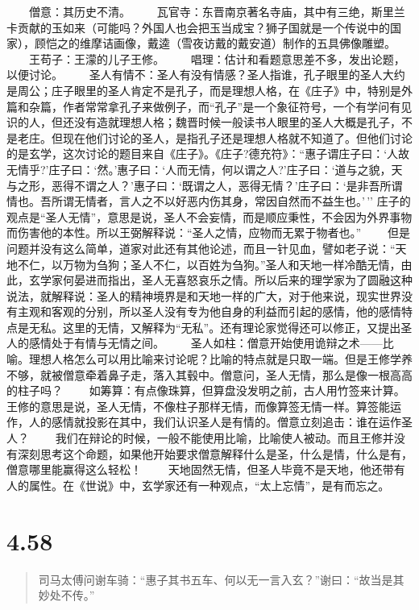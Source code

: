 \documentclass[]{book}
\begin{document}
　　僧意：其历史不清。
　　瓦官寺：东晋南京著名寺庙，其中有三绝，斯里兰卡贡献的玉如来（可能吗？外国人也会把玉当成宝？狮子国就是一个传说中的国家），顾恺之的维摩诘画像，戴逵（雪夜访戴的戴安道）制作的五具佛像雕塑。
　　王苟子：王濛的儿子王修。
　　唱理：估计和看题意思差不多，发出论题，以便讨论。
　　圣人有情不：圣人有没有情感？圣人指谁，孔子眼里的圣人大约是周公；庄子眼里的圣人肯定不是孔子，而是理想人格，在《庄子》中，特别是外篇和杂篇，作者常常拿孔子来做例子，而``孔子''是一个象征符号，一个有学问有见识的人，但还没有造就理想人格；魏晋时候一般读书人眼里的圣人大概是孔子，不是老庄。但现在他们讨论的圣人，是指孔子还是理想人格就不知道了。但他们讨论的是玄学，这次讨论的题目来自《庄子》。《庄子?德充符》：``惠子谓庄子曰：`人故无情乎?'庄子曰：`然。'惠子曰：`人而无情，何以谓之人?'庄子曰：`道与之貌，天与之形，恶得不谓之人？'惠子曰：`既谓之人，恶得无情？'庄子曰：`是非吾所谓情也。吾所谓无情者，言人之不以好恶内伤其身，常因自然而不益生也。'\,''
庄子的观点是``圣人无情''，意思是说，圣人不会妄情，而是顺应秉性，不会因为外界事物而伤害他的本性。所以王弼解释说：``圣人之情，应物而无累于物者也。''
　　但是问题并没有这么简单，道家对此还有其他论述，而且一针见血，譬如老子说：``天地不仁，以万物为刍狗；圣人不仁，以百姓为刍狗。''圣人和天地一样冷酷无情，由此，玄学家何晏进而指出，圣人无喜怒哀乐之情。所以后来的理学家为了圆融这种说法，就解释说：圣人的精神境界是和天地一样的广大，对于他来说，现实世界没有主观和客观的分别，所以圣人没有专为他自身的利益而引起的感情，他的感情特点是无私。这里的无情，又解释为``无私''。还有理论家觉得还可以修正，又提出圣人的感情处于有情与无情之间。
　　圣人如柱：僧意开始使用诡辩之术------比喻。理想人格怎么可以用比喻来讨论呢？比喻的特点就是只取一端。但是王修学养不够，就被僧意牵着鼻子走，落入其毂中。僧意问，圣人无情，那么是像一根高高的柱子吗？
　　如筹算：有点像珠算，但算盘没发明之前，古人用竹签来计算。王修的意思是说，圣人无情，不像柱子那样无情，而像算签无情一样。算签能运作，人的感情就投影在其中，我们认识圣人是有情的。僧意立刻追击：谁在运作圣人？
　　我们在辩论的时候，一般不能使用比喻，比喻使人被动。而且王修并没有深刻思考这个命题，如果他开始要求僧意解释什么是圣，什么是情，什么是有，僧意哪里能赢得这么轻松！
　　天地固然无情，但圣人毕竟不是天地，他还带有人的属性。在《世说》中，玄学家还有一种观点，``太上忘情''，是有而忘之。

\section{4.58}\label{section-235}

\begin{quote}
司马太傅问谢车骑：``惠子其书五车、何以无一言入玄？''谢曰：``故当是其妙处不传。''
\end{quote}
\end{document}
